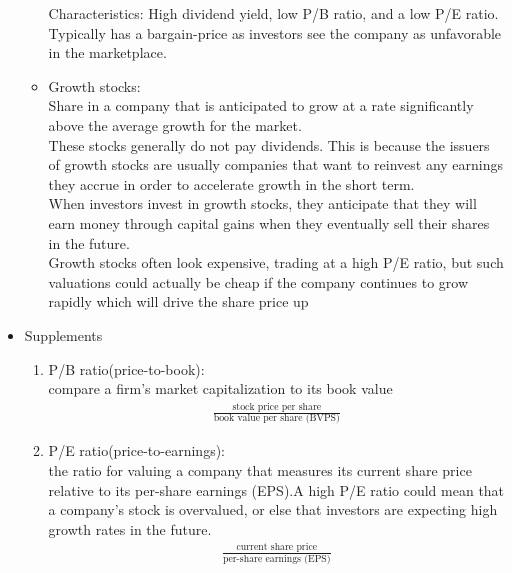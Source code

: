\documentclass{maths}
\begin{document}
\begin{itemize}
\begin{itemize}
Characteristics: High dividend yield, low P/B ratio, and a low P/E ratio.\\

Typically has a bargain-price as investors see the company as unfavorable in the marketplace.

\item Growth stocks:\\
Share in a company that is anticipated to grow at a rate significantly above the average growth for the market. \\These stocks generally do not pay dividends. This is because the issuers of growth stocks are usually companies that want to reinvest any earnings they accrue in order to accelerate growth in the short term. \\When investors invest in growth stocks, they anticipate that they will earn money through capital gains when they eventually sell their shares in the future.\\
Growth stocks often look expensive, trading at a high P/E ratio, but such valuations could actually be cheap if the company continues to grow rapidly which will drive the share price up
\end{itemize}

\item Supplements
\begin{enumerate}
\item P/B ratio(price-to-book): \\compare a firm's market capitalization to its book value
\begin{align*}
\frac{\text{stock price per share}}{\text{book value per share (BVPS)}}
\end{align*}

\item P/E ratio(price-to-earnings):\\the ratio for valuing a company that measures its current share price relative to its per-share earnings (EPS).A high P/E ratio could mean that a company's stock is overvalued, or else that investors are expecting high growth rates in the future.
\begin{align*}
\frac{\text{current share price}}{\text{per-share earnings (EPS)}}
\end{align*}
\end{enumerate}
\end{itemize}
\end{document}
